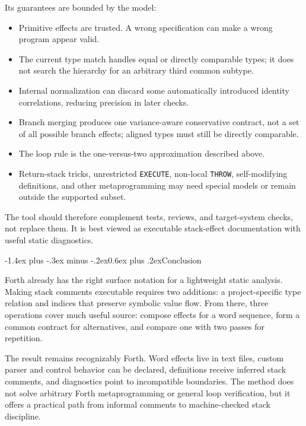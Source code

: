 \documentclass[a4paper,10pt]{article}
\makeatletter
\renewcommand\section{\@startsection{section}{1}{\z@}%
  {-1.4ex plus -.3ex minus -.2ex}{0.6ex plus .2ex}{\large\bfseries}}
\makeatother
\begin{document}
Its guarantees are bounded by the model:
\begin{itemize}
  \item Primitive effects are trusted.  A wrong specification can make a wrong
        program appear valid.
  \item The current type match handles equal or directly comparable types; it
        does not search the hierarchy for an arbitrary third common subtype.
  \item Internal normalization can discard some automatically introduced
        identity correlations, reducing precision in later checks.
  \item Branch merging produces one variance-aware conservative contract, not
        a set of all possible branch effects; aligned types must still be
        directly comparable.
  \item The loop rule is the one-versus-two approximation described above.
  \item Return-stack tricks, unrestricted \texttt{EXECUTE}, non-local
        \texttt{THROW}, self-modifying definitions, and other metaprogramming
        may need special models or remain outside the supported subset.
\end{itemize}
The tool should therefore complement tests, reviews, and target-system checks,
not replace them.  It is best viewed as executable stack-effect documentation
with useful static diagnostics.

\section{Conclusion}

Forth already has the right surface notation for a lightweight static
analysis.  Making stack comments executable requires two additions: a
project-specific type relation and indices that preserve symbolic value flow.
From there, three operations cover much useful source: compose effects for a
word sequence, form a common contract for alternatives, and compare one with
two passes for repetition.

The result remains recognizably Forth.  Word effects live in text files,
custom parser and control behavior can be declared, definitions receive
inferred stack comments, and diagnostics point to incompatible boundaries.
The method does not solve arbitrary Forth metaprogramming or general loop
verification, but it offers a practical path from informal comments to
machine-checked stack discipline.
\end{document}
